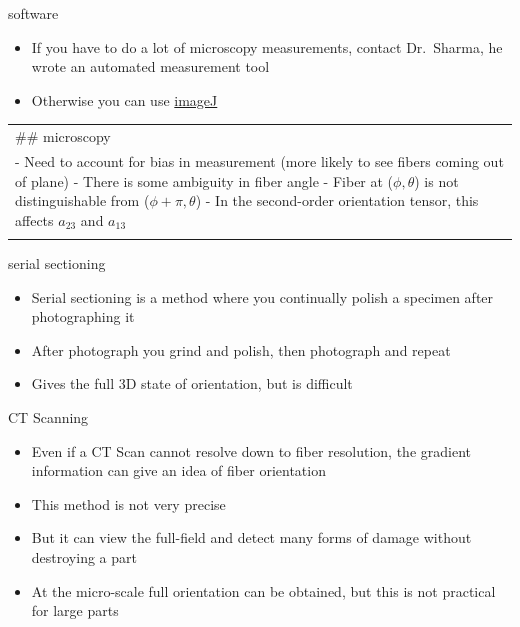 \documentclass[12pt,handout]{beamer}
\providecommand{\tightlist}{%
  \setlength{\itemsep}{0pt}\setlength{\parskip}{0pt}}
\providecommand{\tightlist}{%
\setlength{\itemsep}{0pt}\setlength{\parskip}{0pt}}
\begin{document}
\begin{frame}{software}
\protect\hypertarget{software}{}
\begin{itemize}
\tightlist
\item
  If you have to do a lot of microscopy measurements, contact
  Dr.~Sharma, he wrote an automated measurement tool
\item
  Otherwise you can use
  \href{https://imagej.nih.gov/ij/download.html}{imageJ}
\end{itemize}

\begin{longtable}[]{@{}
  >{\raggedright\arraybackslash}p{}@{}}
\toprule
\endhead
\#\# microscopy \\ \addlinespace
- Need to account for bias in measurement (more likely to see fibers
coming out of plane) - There is some ambiguity in fiber angle - Fiber at
(\(\phi, \theta\)) is not distinguishable from (\(\phi + \pi, \theta\))
- In the second-order orientation tensor, this affects \(a_{23}\) and
\(a_{13}\) \\ \addlinespace
\bottomrule
\end{longtable}
\end{frame}

\begin{frame}{serial sectioning}
\protect\hypertarget{serial-sectioning}{}
\begin{itemize}
\tightlist
\item
  Serial sectioning is a method where you continually polish a specimen
  after photographing it
\item
  After photograph you grind and polish, then photograph and repeat
\item
  Gives the full 3D state of orientation, but is difficult
\end{itemize}
\end{frame}

\begin{frame}{CT Scanning}
\protect\hypertarget{ct-scanning}{}
\begin{itemize}
\tightlist
\item
  Even if a CT Scan cannot resolve down to fiber resolution, the
  gradient information can give an idea of fiber orientation
\item
  This method is not very precise
\item
  But it can view the full-field and detect many forms of damage without
  destroying a part
\item
  At the micro-scale full orientation can be obtained, but this is not
  practical for large parts
\end{itemize}
\end{frame}
\end{document}
